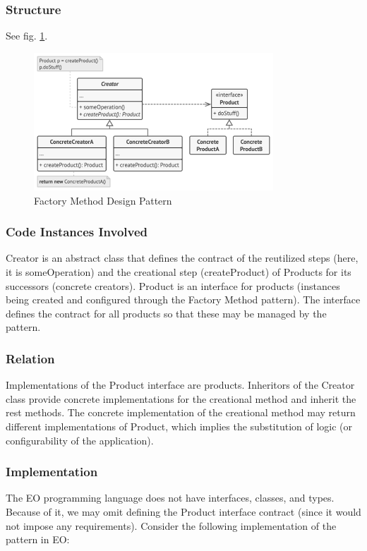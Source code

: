 \documentclass[sigplan,12pt,nonacm=true,review=false]{acmart}
\begin{document}
\subsubsection{Structure}
See fig. \ref{fig:02}.
\begin{figure}[!t]
  \includegraphics[width=0.8\textwidth]{eolang/tr-02/assets/Picture02.png}
  \caption{Factory Method Design Pattern}
  \label{fig:02}
\end{figure}

\subsubsection{Code Instances Involved}
Creator is an abstract class that defines the contract of the reutilized steps (here, it is someOperation) and the creational step (createProduct) of Products for its successors (concrete creators). 
Product is an interface for products (instances being created and configured through the Factory Method pattern). The interface defines the contract for all products so that these may be managed by the pattern.

\subsubsection{Relation}
Implementations of the Product interface are products. Inheritors of the Creator class provide concrete implementations for the creational method and inherit the rest methods. The concrete implementation of the creational method may return different implementations of Product, which implies the substitution of logic (or configurability of the application). 

\subsubsection{Implementation}
The EO programming language does not have interfaces, classes, and types. Because of it, we may omit defining the Product interface contract (since it would not impose any requirements). Consider the following implementation of the pattern in EO: 
\end{document}
